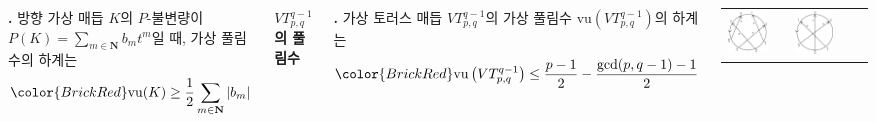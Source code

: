 \documentclass[25pt, a0paper, portrait, margin=0mm, innermargin=15mm,
     blockverticalspace=15mm, colspace=15mm, subcolspace=8mm]{tikzposter}
\def\mysection#1{\textbf{\Large\color{NTNUBlue}\sf #1}\par}
\begin{document}
\begin{columns}
{\bigskip\bigskip
{\textbf{\color{BrickRed}\cite{v_bridge}.} 방향 가상 매듭 $𝐾$의 $P$-불변량이 $\displaystyle P(K)=\sum_{m\in\mathbf{N}}b_mt^m$일 때, 가상 풀림수의 하계는
\[
{\color{BrickRed}\mathrm{vu}(K)\ge \frac12\sum_{m\in\mathbf{N}}|b_m|}
\]
}
}



{
\mysection{$VT_{p,q}^{q-1}$의 풀림수}
\bigskip
{\textbf{\color{BrickRed}.}
가상 토러스 매듭 $VT_{p,q}^{q-1}$의 가상 풀림수 $\mathrm{vu}\left(VT_{p,q}^{q-1}\right)$의 하계는
\[
{\color{BrickRed}\mathrm{vu}\left(VT_{p,q}^{q-1}\right)\le \frac{p-1}{2}-\frac{\gcd(p,q-1)-1}{2}}
\]
}
\vspace{-1em}
\begin{center}
\begin{tabu} to .9\linewidth{X[2,m,c] X[.1,m,c] X[2,m,c] X[.1,m,c] X[3,m,c]}
\includegraphics[width=.8\linewidth]{GVT532}
 &  &
\includegraphics[width=.8\linewidth]{GVT432}

\end{tabu}
\end{center}}
\end{columns}
\end{document}
